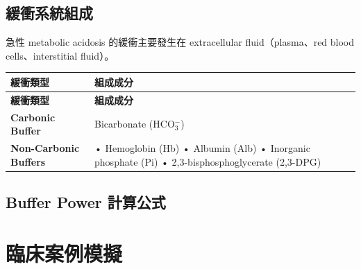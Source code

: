 \documentclass[12pt,a4paper]{article}
\begin{document}
\subsection{緩衝系統組成}

急性 metabolic acidosis 的緩衝主要發生在 extracellular fluid（plasma、red blood cells、interstitial fluid）。

\begin{longtable}{p{4cm}p{10cm}}
\toprule
\textbf{緩衝類型} & \textbf{組成成分} \\
\midrule
\endfirsthead

\toprule
\textbf{緩衝類型} & \textbf{組成成分} \\
\midrule
\endhead

\bottomrule
\endfoot

\textbf{Carbonic Buffer} & Bicarbonate (HCO$_3^-$) \\
\midrule
\textbf{Non-Carbonic Buffers} &
• Hemoglobin (Hb)\newline
• Albumin (Alb)\newline
• Inorganic phosphate (Pi)\newline
• 2,3-bisphosphoglycerate (2,3-DPG) \\
\bottomrule
\end{longtable}

\subsection{Buffer Power 計算公式}


\section{臨床案例模擬}
\end{document}
